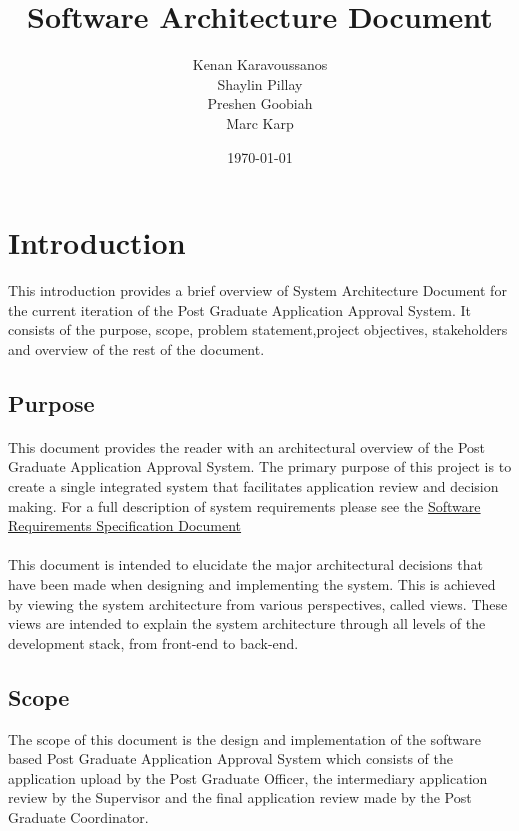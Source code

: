 \documentclass[11pt]{article}
\title{ Software Architecture Document}
\author{ Kenan Karavoussanos \\ Shaylin Pillay \\ Preshen Goobiah \\ Marc Karp}
\date{\today}
\begin{document}
\maketitle
\newpage
\tableofcontents

%
\newpage
\section{Introduction}
This introduction provides a brief overview of System Architecture Document for the current iteration of the Post Graduate Application Approval System. It consists of the purpose, scope, problem statement,project objectives, stakeholders and overview of the rest of the document.
\subsection{Purpose}
\paragraph{}This document provides the reader with an architectural overview of the Post Graduate Application Approval System. The primary purpose of this project is to create a single integrated system that facilitates application review and decision making. For a full description of system requirements please see the \href{https://github.com/KenanKarav/COMS3002/blob/master/PGASystemDocs/System\%20Requirements\%20Specification/Software\%20Requirements\%20Specification.pdf}{Software Requirements Specification Document}

\paragraph{}This document is intended to elucidate the major architectural decisions that have been made when designing and implementing the system. This is achieved by viewing the system architecture from various perspectives, called views. These views are intended to explain the system architecture through all levels of the development stack, from front-end to back-end.


\subsection{Scope}
The scope of this document is the design and implementation of the software based Post Graduate Application Approval System which consists of the application upload by the Post Graduate Officer, the intermediary application review by the Supervisor and the final application review made by the Post Graduate Coordinator.
\end{document}
